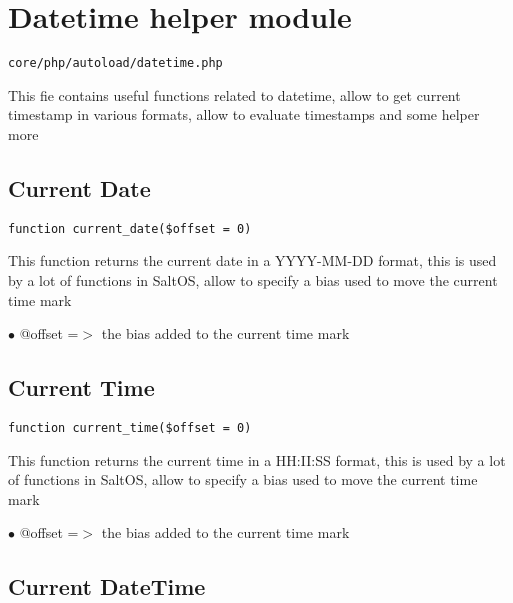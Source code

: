 \documentclass[a4paper]{book}
\begin{document}
\hypertarget{toc68}{}
\section{Datetime helper module}

\begin{lstlisting}
core/php/autoload/datetime.php
\end{lstlisting}

This fie contains useful functions related to datetime, allow to get current timestamp in various
formats, allow to evaluate timestamps and some helper more

\hypertarget{toc69}{}
\subsection{Current Date}

\begin{lstlisting}
function current_date($offset = 0)
\end{lstlisting}

This function returns the current date in a YYYY-MM-DD format, this is used
by a lot of functions in SaltOS, allow to specify a bias used to move the
current time mark

\begin{compactitem}
\item[\color{myblue}$\bullet$] @offset =$>$ the bias added to the current time mark
\end{compactitem}

\hypertarget{toc70}{}
\subsection{Current Time}

\begin{lstlisting}
function current_time($offset = 0)
\end{lstlisting}

This function returns the current time in a HH:II:SS format, this is used
by a lot of functions in SaltOS, allow to specify a bias used to move the
current time mark

\begin{compactitem}
\item[\color{myblue}$\bullet$] @offset =$>$ the bias added to the current time mark
\end{compactitem}

\hypertarget{toc71}{}
\subsection{Current DateTime}
\end{document}
